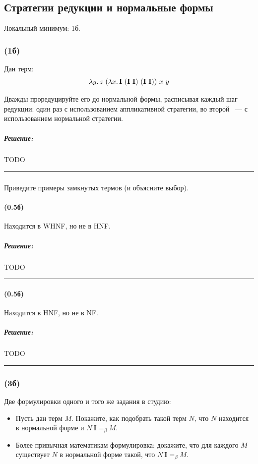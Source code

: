\documentclass{article}
\newenvironment{proof}{\subparagraph{\hspace{-1em}Решение:\newline}}{\par\noindent\rule{\textwidth}{0.4pt}}
\newcommand{\comb}[1]{\mathbf{#1}}
\newcommand{\eqbeta}{=_\beta}
\begin{document}
    \subsection{Стратегии редукции и нормальные формы}

    Локальный минимум: 1б.

    \subsubsection{(1б)}

    Дан терм:
    \[\lambda y\ldotp z~(\lambda x\ldotp \comb{I}~(\comb{I}~\comb{I})~(\comb{I}~\comb{I}))~x~y\]

    Дважды проредуцируйте его до нормальной формы, расписывая каждый шаг редукции: один раз с использованием аппликативной стратегии, во второй ~--- с
    использованием нормальной стратегии.

    \begin{proof}
        TODO %
    \end{proof}

    \subsubsection{}

    Приведите примеры замкнутых термов (и объясните выбор).

    \paragraph{(0.5б)}

    Находится в WHNF, но не в HNF.

    \begin{proof}
        TODO %
    \end{proof}

    \paragraph{(0.5б)}

    Находится в HNF, но не в NF.

    \begin{proof}
        TODO %
    \end{proof}

    \subsubsection{(3б)}

    Две формулировки одного и того же задания в студию:
    \begin{itemize}
        \item Пусть дан терм $M$.
        Покажите, как подобрать такой терм $N$, что $N$ находится в нормальной форме и $N~\comb{I} =_\beta M$.
        \item Более привычная математикам формулировка: докажите, что для каждого $M$ существует $N$ в нормальной форме такой, что $N~\comb{I} \eqbeta M$.
    \end{itemize}
\end{document}
